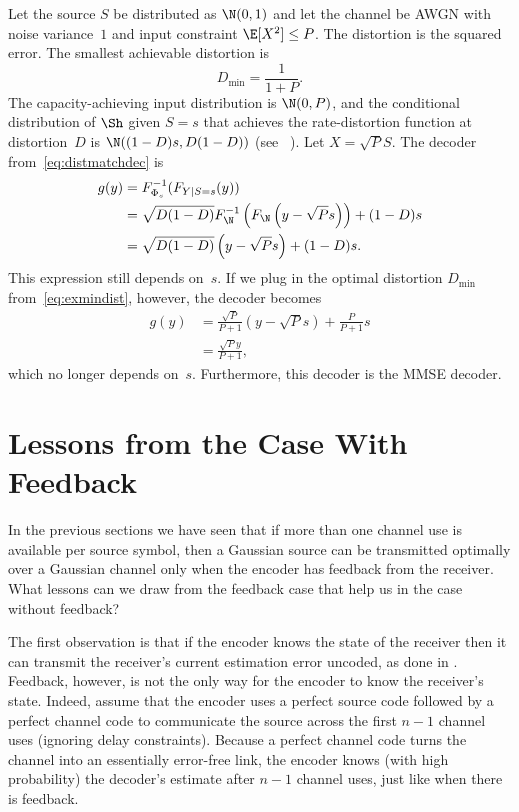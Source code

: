 \begin{example}
  Let the source $S$ be distributed as $\N(0,1)$ and let the channel be AWGN
  with noise variance~$1$ and input constraint $\E[X^2] \le P$.
  The distortion is the squared error. The smallest achievable distortion is
  \begin{equation}
    \label{eq:exmindist}
    D_{\min} = \frac{1}{1 + P}.
  \end{equation}
  The capacity-achieving input distribution is $\N(0,P)$, and the conditional
  distribution of $\Sh$ given $S=s$ that achieves the rate-distortion function
  at distortion~$D$ is $\N((1-D)s, D(1-D))$ (see \eg~\cite{CoverT1991}).
  Let $X = \sqrt{P}S$.  The decoder from~\eqref{eq:distmatchdec} is
  \begin{align*}
    g(y) &= F_{\Phi_s}^{-1} (F_{Y|S=s}(y)) \\
    &= \sqrt{D(1-D)} F_{\N}^{-1} \left( F_{\N}\left( y-\sqrt{P}s
    \right) \right) + (1-D)s \\
    &= \sqrt{D(1-D)} \left( y-\sqrt{P}s \right) + (1-D)s.
  \end{align*}
  This expression still depends on~$s$. If we plug in the optimal distortion
  $D_{\min}$ from~\eqref{eq:exmindist}, however, the decoder becomes
  \begin{align*}
    g(y) &= \frac{\sqrt{P}}{P+1} (y - \sqrt{P}s) + \frac{P}{P +
    1}s \\ 
    &= \frac{\sqrt{P}y}{P + 1},
  \end{align*}
  which no longer depends on~$s$. Furthermore, this decoder is the MMSE decoder.
\end{example}


\section{Lessons from the Case With Feedback}

In the previous sections we have seen that if more than one channel use is
available per source symbol, then a Gaussian source can be transmitted optimally
over a Gaussian channel only when the encoder has feedback from the receiver.
What lessons can we draw from the feedback case that help us in the case without
feedback?

The first observation is that if the encoder knows the state of the receiver
then it can transmit the receiver's current estimation error uncoded, as done in
. Feedback, however, is not the only way for the encoder to know
the receiver's state. Indeed, assume that the encoder uses a perfect source code
followed by a perfect channel code to communicate the source across the first
$n-1$ channel uses (ignoring delay constraints). Because a perfect channel code
turns the channel into an essentially error-free link, the encoder knows (with
high probability) the decoder's estimate after $n-1$ channel uses, just like
when there is feedback.

